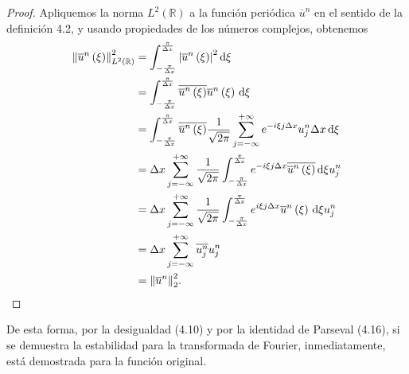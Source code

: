 \begin{proof}
  Apliquemos la norma $L^{2}\left(\mathbb{R}\right)$ a la función
  periódica $\overline{u}^{n}$ en el sentido de la definición 4.2, y
  usando propiedades de los números complejos, obtenemos
  \begin{align*}
    {\left\|
      \overline{u}^{n}
      \left(\xi\right)
    \right\|}^{2}_{L^{2}\left(\mathbb{R}\right)} & =
    \int_{-\frac{\pi}{\Delta x}}^{\frac{\pi}{\Delta x}}
    {\left|
      \overline{u}^{n}
      \left(\xi\right)
      \right|}^{2}
    \dl\xi                                           \\
                                                 & =
    \int_{-\frac{\pi}{\Delta x}}^{\frac{\pi}{\Delta x}}
    \overline{\overline{u}^{n}\left(\xi\right)}
    \overline{u}^{n}
    \left(\xi\right)
    \dl\xi                                           \\
                                                 & =
    \int_{-\frac{\pi}{\Delta x}}^{\frac{\pi}{\Delta x}}
    \overline{\overline{u}^{n}\left(\xi\right)}
    \frac{1}{\sqrt{2\pi}}
    \sum_{j=-\infty}^{+\infty}
    e^{-i\xi j\Delta x}
    u^{n}_{j}
    \Delta x
    \dl\xi                                           \\
                                                 & =
    \Delta x
    \sum_{j=-\infty}^{+\infty}
    \frac{1}{\sqrt{2\pi}}
    \int_{-\frac{\pi}{\Delta x}}^{\frac{\pi}{\Delta x}}
    e^{-i\xi j \Delta x}
    \overline{\overline{u}^{n}\left(\xi\right)}
    \dl\xi
    u^{n}_{j}                                        \\
                                                 & =
    \Delta x
    \sum_{j=-\infty}^{+\infty}
    \frac{1}{\sqrt{2\pi}}
    \int_{-\frac{\pi}{\Delta x}}^{\frac{\pi}{\Delta x}}
    e^{i\xi j \Delta x}
    \overline{u}^{n}
    \left(\xi\right)
    \dl\xi
    u^{n}_{j}                                        \\
                                                 & =
    \Delta x
    \sum_{j=-\infty}^{+\infty}
    \overline{u^{n}_{j}}
    u^{n}_{j}                                        \\
                                                 & =
    {\left\|\overline{u}^{n}\right\|}^{2}_{2}.
  \end{align*}
\end{proof}

De esta forma, por la desigualdad (4.10) y por la identidad de
Parseval (4.16), si se demuestra la estabilidad para la transformada
de Fourier, inmediatamente, está demostrada para la función original.

